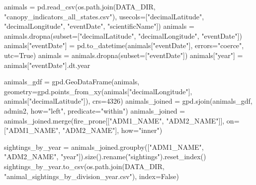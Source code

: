 \documentclass[
  letterpaper,
  DIV=11,
  numbers=noendperiod]{scrartcl}
\newenvironment{Shaded}{\begin{snugshade}}{\end{snugshade}}
\newcommand{\DecValTok}[1]{\textcolor[rgb]{0.68,0.00,0.00}{#1}}
\newcommand{\NormalTok}[1]{\textcolor[rgb]{0.00,0.23,0.31}{#1}}
\newcommand{\OperatorTok}[1]{\textcolor[rgb]{0.37,0.37,0.37}{#1}}
\newcommand{\StringTok}[1]{\textcolor[rgb]{0.13,0.47,0.30}{#1}}
\newcommand{\VariableTok}[1]{\textcolor[rgb]{0.07,0.07,0.07}{#1}}
\begin{document}
\begin{Shaded}
\begin{Highlighting}[]
\NormalTok{animals }\OperatorTok{=}\NormalTok{ pd.read\_csv(os.path.join(DATA\_DIR, }\StringTok{"canopy\_indicators\_all\_states.csv"}\NormalTok{),}
\NormalTok{                       usecols}\OperatorTok{=}\NormalTok{[}\StringTok{"decimalLatitude"}\NormalTok{, }\StringTok{"decimalLongitude"}\NormalTok{, }\StringTok{"eventDate"}\NormalTok{, }\StringTok{"scientificName"}\NormalTok{])}
\NormalTok{animals }\OperatorTok{=}\NormalTok{ animals.dropna(subset}\OperatorTok{=}\NormalTok{[}\StringTok{"decimalLatitude"}\NormalTok{, }\StringTok{"decimalLongitude"}\NormalTok{, }\StringTok{"eventDate"}\NormalTok{])}
\NormalTok{animals[}\StringTok{"eventDate"}\NormalTok{] }\OperatorTok{=}\NormalTok{ pd.to\_datetime(animals[}\StringTok{"eventDate"}\NormalTok{], errors}\OperatorTok{=}\StringTok{"coerce"}\NormalTok{, utc}\OperatorTok{=}\VariableTok{True}\NormalTok{)}
\NormalTok{animals }\OperatorTok{=}\NormalTok{ animals.dropna(subset}\OperatorTok{=}\NormalTok{[}\StringTok{"eventDate"}\NormalTok{])}
\NormalTok{animals[}\StringTok{"year"}\NormalTok{] }\OperatorTok{=}\NormalTok{ animals[}\StringTok{"eventDate"}\NormalTok{].dt.year}

\NormalTok{animals\_gdf }\OperatorTok{=}\NormalTok{ gpd.GeoDataFrame(animals, geometry}\OperatorTok{=}\NormalTok{gpd.points\_from\_xy(animals[}\StringTok{"decimalLongitude"}\NormalTok{], animals[}\StringTok{"decimalLatitude"}\NormalTok{]), crs}\OperatorTok{=}\DecValTok{4326}\NormalTok{)}
\NormalTok{animals\_joined }\OperatorTok{=}\NormalTok{ gpd.sjoin(animals\_gdf, admin2, how}\OperatorTok{=}\StringTok{"left"}\NormalTok{, predicate}\OperatorTok{=}\StringTok{"within"}\NormalTok{)}
\NormalTok{animals\_joined }\OperatorTok{=}\NormalTok{ animals\_joined.merge(fire\_prone[[}\StringTok{"ADM1\_NAME"}\NormalTok{, }\StringTok{"ADM2\_NAME"}\NormalTok{]], on}\OperatorTok{=}\NormalTok{[}\StringTok{"ADM1\_NAME"}\NormalTok{, }\StringTok{"ADM2\_NAME"}\NormalTok{], how}\OperatorTok{=}\StringTok{"inner"}\NormalTok{)}

\NormalTok{sightings\_by\_year }\OperatorTok{=}\NormalTok{ animals\_joined.groupby([}\StringTok{"ADM1\_NAME"}\NormalTok{, }\StringTok{"ADM2\_NAME"}\NormalTok{, }\StringTok{"year"}\NormalTok{]).size().rename(}\StringTok{"sightings"}\NormalTok{).reset\_index()}
\NormalTok{sightings\_by\_year.to\_csv(os.path.join(DATA\_DIR, }\StringTok{"animal\_sightings\_by\_division\_year.csv"}\NormalTok{), index}\OperatorTok{=}\VariableTok{False}\NormalTok{)}
\end{Highlighting}
\end{Shaded}
\end{document}
